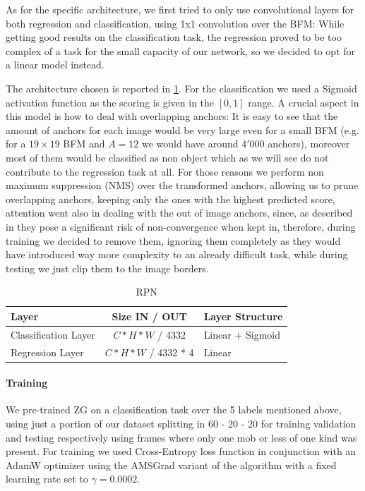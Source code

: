 \documentclass[10pt,journal,cspaper,compsoc]{IEEEtran}
\begin{document}
     As for the specific architecture, we first tried to only use convolutional layers for both regression and classification, using 1x1 convolution over the BFM: While getting good results on the classification task, the regression proved to be too complex of a task for the small capacity of our network, so we decided to opt for a linear model instead. 

The architecture chosen is reported in \ref*{tab:Table 2}. For the classification we used a Sigmoid activation function as the scoring is given in the $[0, 1]$ range.  A crucial aspect in this model is how to deal with overlapping anchors: It is easy to see that the amount of anchors for each image would be very large even for a small BFM (e.g. for a $19\times 19$ BFM and $A = 12$ we would have around $4'000$ anchors), moreover most of them would be classified as non object which as we will see do not contribute to the regression task at all. For those reasons we perform non maximum suppression (NMS) over the transformed anchors, allowing us to prune overlapping anchors, keeping only the ones with the highest predicted score, attention went also in dealing with the out of image anchors, since, as described in \cite{arxiv:FasterRCNN} they pose a significant risk of non-convergence when kept in, therefore, during training we decided to remove them, ignoring them completely as they would have introduced way more complexity to an already difficult task, while during testing we just clip them to the image borders.

    \begin{table}[htb]
        \caption{RPN}
        \label{tab:Table 2}
        \begin{tabularx}{.5\textwidth}{l | c |  l}  
            \textbf{Layer} & \textbf{Size IN / OUT} & \textbf{Layer Structure}\\
            \hline 
            Classification Layer &  $ C * H * W$ / 4332        & Linear + Sigmoid \\ 
            Regression Layer    &  $ C * H * W$ / 4332 * 4  & Linear \\
        \end{tabularx}
    \end{table}
    
    \paragraph*{Training}%
	    We pre-trained ZG on a classification task over the 5 labels mentioned above,  using just a portion of our dataset splitting in 60 - 20 - 20 for training validation and testing respectively using frames where only one mob or less of one kind was present. For training we used Cross-Entropy loss function in conjunction with an AdamW optimizer using the AMSGrad variant of the algorithm with a fixed learning rate set to $\gamma = 0.0002$.
\end{document}

